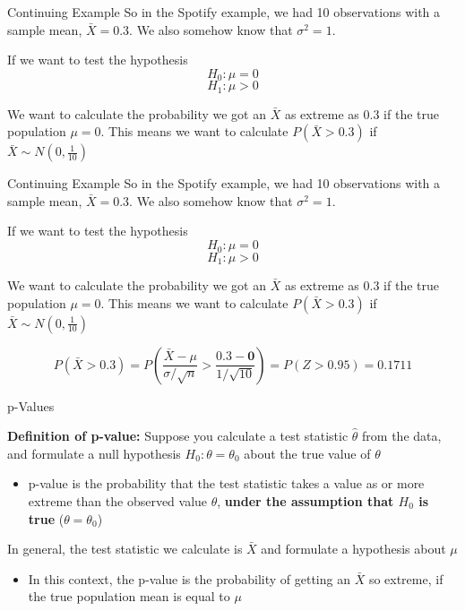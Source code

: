 \documentclass{beamer}
\begin{document}
\begin{frame}{Continuing Example}
	So in the Spotify example, we had 10 observations with a sample mean, $\bar{X}=0.3$. We also somehow know that $\sigma^2 = 1$. 
	
	If we want to test the hypothesis 
	$$H_0: \mu=0$$
	$$H_1: \mu > 0$$

	We want to calculate the probability we got an $\bar{X}$ as extreme as 0.3 if the true population $\mu=0$. This means we want to calculate $P(\bar{X}>0.3)$ if $\bar{X} \sim N(0,\frac{1}{10})$

\end{frame}

\frame{}

\begin{frame}{Continuing Example}
	So in the Spotify example, we had 10 observations with a sample mean, $\bar{X}=0.3$. We also somehow know that $\sigma^2 = 1$. 
	
	If we want to test the hypothesis 
	$$H_0: \mu=0$$
	$$H_1: \mu > 0$$

	We want to calculate the probability we got an $\bar{X}$ as extreme as 0.3 if the true population $\mu=0$. This means we want to calculate $P(\bar{X}>0.3)$ if $\bar{X} \sim N(0,\frac{1}{10})$

	$$P(\bar{X}>0.3) = P(\frac{\bar{X}-\mu}{\sigma/\sqrt{n}} > \frac{0.3-\textbf{0}}{1/\sqrt{10}}) = P(Z>0.95) = 0.1711$$
\end{frame}


\begin{frame}{p-Values}
	
	\textbf{Definition of p-value:} Suppose you calculate a test statistic $\hat{\theta}$ from the data, and formulate a null hypothesis $H_0: \theta=\theta_0$ about the true value of $\theta$
	\begin{itemize}
		\item \alert{p-value} is the probability that the test statistic takes a value as or more extreme than the observed value $\hat{\theta}$, \textbf{under the assumption that $H_0$ is true} ($\theta=\theta_0$)
	\end{itemize}
	
	In general, the test statistic we calculate is $\bar{X}$ and formulate a hypothesis about $\mu$
	\begin{itemize}
		\item In this context, the p-value is the probability of getting an $\bar{X}$ so extreme, if the true population mean is equal to $\mu$
	\end{itemize}
	
\end{frame}
\end{document}
